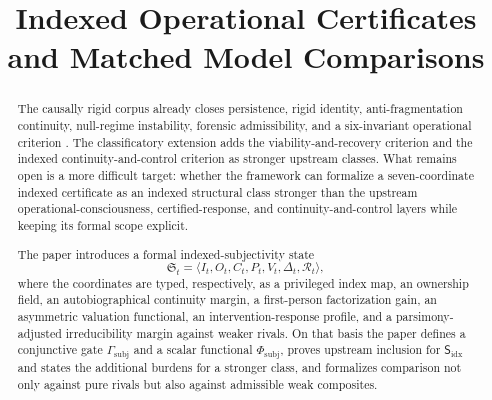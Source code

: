 \documentclass[11pt,a4paper]{article}
\title{\textbf{Indexed Operational Certificates and Matched Model Comparisons}}
\author{\AuthorVisible}
\date{}
\theoremstyle{definition}
\newcommand{\Subfp}{\mathsf{S}_{\mathrm{idx}}}
\newcommand{\Substate}{\mathfrak{S}}
\newcommand{\SelfIndex}{I}
\newcommand{\OwnField}{O}
\newcommand{\ContField}{C}
\newcommand{\Persp}{P}
\newcommand{\ValAsym}{V}
\newcommand{\IntervProf}{\Delta}
\newcommand{\Irred}{\mathcal{R}}
\newcommand{\GateSubj}{\Gamma_{\mathrm{subj}}}
\newcommand{\PhiSubj}{\Phi_{\mathrm{subj}}}
\begin{document}
\setlength{\emergencystretch}{3em}
\maketitle

\begin{abstract}
The causally rigid corpus already closes persistence, rigid identity, anti-fragmentation continuity, null-regime instability, forensic admissibility, and a six-invariant operational criterion \cite{core,paper1,paper2,paper3,paper4,paper5}. The classificatory extension adds the viability-and-recovery criterion and the indexed continuity-and-control criterion as stronger upstream classes. What remains open is a more difficult target: whether the framework can formalize a seven-coordinate indexed certificate as an indexed structural class stronger than the upstream operational-consciousness, certified-response, and continuity-and-control layers while keeping its formal scope explicit.

The paper introduces a formal indexed-subjectivity state
\[
\Substate_t=\langle \SelfIndex_t,\OwnField_t,\ContField_t,\Persp_t,\ValAsym_t,\IntervProf_t,\Irred_t \rangle,
\]
where the coordinates are typed, respectively, as a privileged index map, an ownership field, an auto\-bio\-graphical continuity margin, a first-person factorization gain, an asymmetric valuation functional, an intervention-response profile, and a parsimony-adjusted irreducibility margin against weaker rivals. On that basis the paper defines a conjunctive gate $\GateSubj$ and a scalar functional $\PhiSubj$, proves upstream inclusion for $\Subfp$ and states the additional burdens for a stronger class, and formalizes comparison not only against pure rivals but also against admissible weak composites.


\end{abstract}
\end{document}
